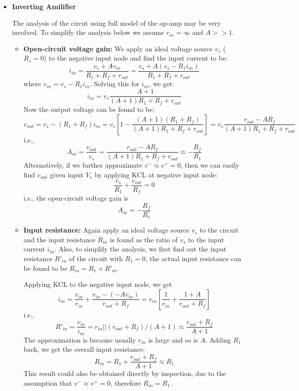 \begin{itemize}
\item {\bf Inverting Amilifier}


  The analysis of the circut using full model of the op-amp may be very involved.
  To simplify the analysis below we assume $r_{in}=\infty$ and $A>>1$.

  \begin{itemize}
    \item {\bf Open-circuit voltage gain:} We apply an ideal voltage source $v_s$ 
      ($R_s=0$) to the negative input node and find the input current to be:
      \[ i_{in}=\frac{v_s+Av_{in}}{R_1+R_f+r_{out}}
      =\frac{v_s+A(v_s-R_1 i_{in})}{R_1+R_f+r_{out}} \]
      where $v_{in}=v_s-R_1 i_{in}$. Solving this for $i_{in}$, we get:
      \[ i_{in}=v_s \frac{A+1}{(A+1)R_1+R_f+r_{out}} \]
      Now the output voltage can be found to be:
      \[ v_{out}=v_s-(R_1+R_f) i_{in}
      =v_s[1-\frac{(A+1)(R_1+R_f)}{(A+1)R_1+R_f+r_{out}}] 
      =v_s\frac{r_{out}-AR_f}{(A+1)R_1+R_f+r_{out}} \] 
      i.e., 
      \[ A_{oc}=\frac{v_{out}}{v_s}=\frac{r_{out}-AR_f}{(A+1)R_1+R_f+r_{out}} 
      \approx - \frac{R_f}{R_1} \]
      Alternatively, if we further approximate $v^-\approx v^+=0$, then we can 
      easily find $v_{out}$ given input $V_s$ by applying KCL at negative input 
      node:
      \[ \frac{v_s}{R_1}+\frac{v_{out}}{R_f} = 0 \]
      i.e., the open-circuit voltage gain is
      \[ A_{oc}=-\frac{R_f}{R_1} \]

    \item {\bf Input resistance:} Again apply an ideal voltage source $v_s$ to
      the circuit and the input resistance $R_{in}$ is found as the ratio of
      $v_s$ to the input current $i_{in}$. Also, to simplify the analysis, we 
      first find out the input resistance $R'_{in}$ of the circuit with $R_1=0$, 
      the actual input resistance can be found to be $R_{in}=R_1+R'_{in}$. 

      Applying KCL to the negative input node, we get
      \[ i_{in}=\frac{v_{in}}{r_{in}}+\frac{v_{in}-(-Av_{in})}{r_{out}+R_f}
      =v_{in}[ \frac{1}{r_{in}}+\frac{1+A}{r_{out}+R_f}] \]
      i.e., 
      \[ R'_{in}=\frac{v_{in}}{i_{in}}=r_{in} || (r_{out}+R_f)/(A+1) 
      \approx \frac{r_{out}+R_f}{A+1} \]
      The approximation is because usually $r_{in}$ is large and so is $A$.
      Adding $R_1$ back, we get the overall input resistance:
      \[ R_{in}=R_1+\frac{r_{out}+R_f}{A+1} \approx R_1 \]
      This result could also be obtained directly by inspection, due to the
      assumption that $v^-\approx v^+=0$, therefore $R_{in}=R_1$.


\end{itemize}
\end{itemize}
